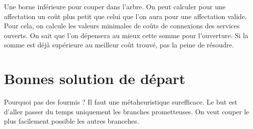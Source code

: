 Une borne inférieure pour couper dans l'arbre.
On peut calculer pour une affectation un coût plus petit que celui que l'on aura pour une affectation valide.
Pour cela, on calcule les valeurs minimales de coûts de connexions des services ouverts.
On sait que l'on dépensera au mieux cette somme pour l'ouverture. Si la somme est déjà supérieure au meilleur coût trouvé, pas la peine de résoudre.

\section{Bonnes solution de départ}

Pourquoi pas des fourmis ? Il faut une métaheuristique surefficace. Le but est d'aller passer du temps uniquement les branches prometteuses.
On veut couper le plus facilement possible les autres brancehes.
